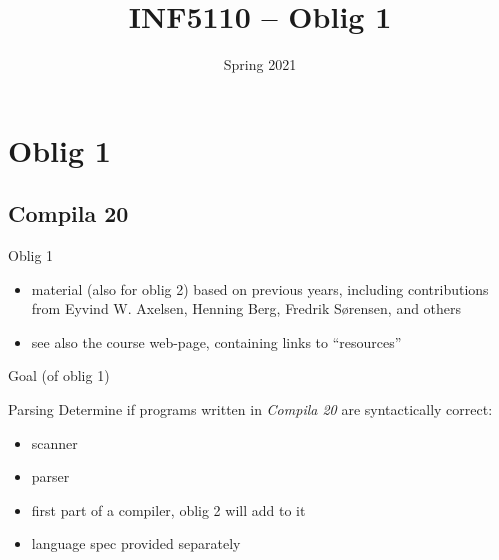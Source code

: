\documentclass{beamer}
\date{Spring 2021}
\title{INF5110 -- Oblig 1}
\renewcommand{\maketitle}{}
\begin{document}
\maketitle
\chapter{Oblig 1}
\label{sec:org7ddd2b8}



\section{Compila 20}
\label{sec:orgd24b319}

\begin{frame}[label={sec:orgc365a10}]{Oblig 1}
\begin{itemize}
\item material (also for oblig 2) based on previous years, including contributions from Eyvind
W. Axelsen, Henning Berg, Fredrik Sørensen, and others
\end{itemize}


\begin{itemize}
\item see also the course web-page, containing links to ``resources''
\end{itemize}
\end{frame}


\begin{frame}[label={sec:org855a29a}]{Goal (of oblig 1)}
\begin{block}{Parsing}
Determine if programs written in \emph{Compila 20} are syntactically correct: 

\begin{itemize}
\item scanner
\item parser
\end{itemize}
\end{block}


\begin{itemize}
\item first part of a compiler, oblig 2 will add to it
\item language spec provided separately
\end{itemize}
\end{frame}
\end{document}
